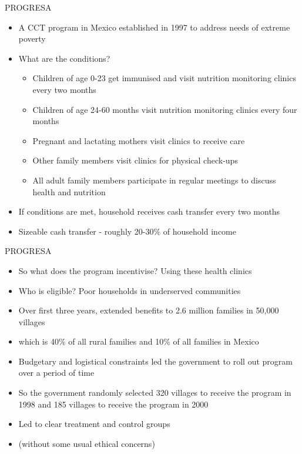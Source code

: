 \documentclass[11pt,notes=hide,aspectratio=169,mathserif]{beamer}
\begin{document}
\begin{frame}{PROGRESA}
\begin{itemize}
\item A CCT program in Mexico established in 1997 to address needs of extreme poverty
\pause \item What are the conditions?
\begin{itemize}
    \pause \item Children of age 0-23 get immunised and visit nutrition monitoring clinics every two months 
    \pause \item Children of age 24-60 months visit nutrition monitoring clinics every four months 
    \pause \item Pregnant and lactating mothers visit clinics to receive care 
    \pause \item Other family members visit clinics for physical check-ups
    \pause \item All adult family members participate in regular meetings to discuss health and nutrition
\end{itemize}
\pause \item If conditions are met, household receives cash transfer every two months
\pause \item Sizeable cash transfer - roughly 20-30\% of household income
\end{itemize}
\end{frame}

\begin{frame}{PROGRESA}
\begin{itemize}
\item So what does the program incentivise? \pause Using these health clinics
\pause \item Who is eligible? \pause Poor households in underserved communities
\pause \item Over first three years, extended benefits to 2.6 million families in 50,000 villages 
\pause \item which is 40\% of all rural families and 10\% of all families in Mexico 
\pause \item Budgetary and logistical constraints led the government to roll out program over a period of time 
\pause \item So the government randomly selected 320 villages to receive the program in 1998 and 185 villages to receive the program in 2000 
\pause \item Led to clear treatment and control groups 
\pause \item (without some usual ethical concerns)
\end{itemize}
\end{frame}
\end{document}
